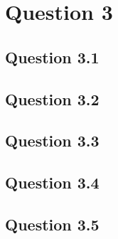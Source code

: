 \documentclass[11pt,twoside,a4paper]{article}
\begin{document}
 \section{Question 3}
 
 	\subsection{Question 3.1}
 	
 	\subsection{Question 3.2}
 	
 	\subsection{Question 3.3}
 	
 	\subsection{Question 3.4}
 	
 	\subsection{Question 3.5}
		
	
\begin{thebibliography}{9}
\end{thebibliography}
\end{document}
